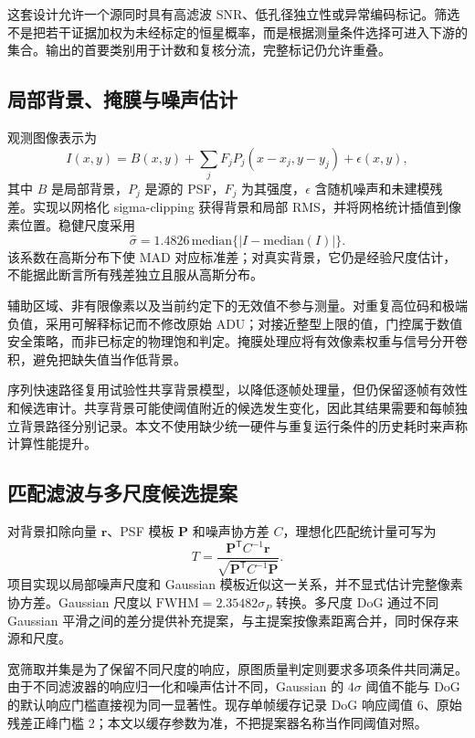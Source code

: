 \documentclass[UTF8,a4paper,11pt,fontset=windows]{ctexart}
\begin{document}
这套设计允许一个源同时具有高滤波 SNR、低孔径独立性或异常编码标记。筛选不是把若干证据加权为未经标定的恒星概率，而是根据测量条件选择可进入下游的集合。输出的首要类别用于计数和复核分流，完整标记仍允许重叠。

\subsection{局部背景、掩膜与噪声估计}
观测图像表示为
\begin{equation}
 I(x,y)=B(x,y)+\sum_j F_jP_j(x-x_j,y-y_j)+\epsilon(x,y),
 \label{eq:model}
\end{equation}
其中 $B$ 是局部背景，$P_j$ 是源的 PSF，$F_j$ 为其强度，$\epsilon$ 含随机噪声和未建模残差。实现以网格化 sigma-clipping 获得背景和局部 RMS，并将网格统计插值到像素位置。稳健尺度采用
\begin{equation}
 \widehat\sigma=1.4826\,\mathrm{median}\{|I-\mathrm{median}(I)|\}.
\end{equation}
该系数在高斯分布下使 MAD 对应标准差；对真实背景，它仍是经验尺度估计，不能据此断言所有残差独立且服从高斯分布。

辅助区域、非有限像素以及当前约定下的无效值不参与测量。对重复高位码和极端负值，采用可解释标记而不修改原始 ADU；对接近整型上限的值，门控属于数值安全策略，而非已标定的物理饱和判定。掩膜处理应将有效像素权重与信号分开卷积，避免把缺失值当作低背景。

序列快速路径复用试验性共享背景模型，以降低逐帧处理量，但仍保留逐帧有效性和候选审计。共享背景可能使阈值附近的候选发生变化，因此其结果需要和每帧独立背景路径分别记录。本文不使用缺少统一硬件与重复运行条件的历史耗时来声称计算性能提升。

\subsection{匹配滤波与多尺度候选提案}
对背景扣除向量 $\bm r$、PSF 模板 $\bm P$ 和噪声协方差 $C$，理想化匹配统计量可写为
\begin{equation}
 T=\frac{\bm P^{\mathsf T}C^{-1}\bm r}
 {\sqrt{\bm P^{\mathsf T}C^{-1}\bm P}}.
 \label{eq:mf}
\end{equation}
项目实现以局部噪声尺度和 Gaussian 模板近似这一关系，并不显式估计完整像素协方差。Gaussian 尺度以 $\mathrm{FWHM}=2.35482\sigma_P$ 转换。多尺度 DoG 通过不同 Gaussian 平滑之间的差分提供补充提案，与主提案按像素距离合并，同时保存来源和尺度。

宽筛取并集是为了保留不同尺度的响应，原图质量判定则要求多项条件共同满足。由于不同滤波器的响应归一化和噪声估计不同，Gaussian 的 $4\sigma$ 阈值不能与 DoG 的默认响应门槛直接视为同一显著性。现存单帧缓存记录 DoG 响应阈值 6、原始残差正峰门槛 2；本文以缓存参数为准，不把提案器名称当作同阈值对照。
\end{document}
